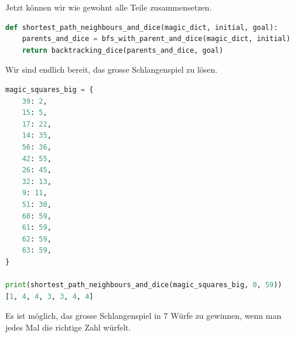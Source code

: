 \begin{enumerate}[(a)]
    Jetzt können wir wie gewohnt alle Teile zusammensetzen.
    \begin{lstlisting}[language=Python]
def shortest_path_neighbours_and_dice(magic_dict, initial, goal):
    parents_and_dice = bfs_with_parent_and_dice(magic_dict, initial)
    return backtracking_dice(parents_and_dice, goal)
    \end{lstlisting}
    
    Wir sind endlich bereit, das grosse Schlangenspiel zu lösen.
    \begin{lstlisting}[language=Python]
magic_squares_big = {
    39: 2,
    15: 5,
    17: 22,
    14: 35,
    56: 36,
    42: 55,
    26: 45,
    32: 13,
    9: 11,
    51: 30,
    60: 59,
    61: 59,
    62: 59,
    63: 59,
}

print(shortest_path_neighbours_and_dice(magic_squares_big, 0, 59))
[1, 4, 4, 3, 3, 4, 4]
    \end{lstlisting}
    Es ist möglich, das grosse Schlangenspiel in 7 Würfe zu gewinnen, wenn man jedes Mal die richtige Zahl würfelt.
\end{enumerate}










